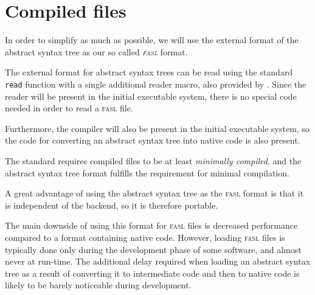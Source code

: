 \chapter{Compiled files}
\label{chap-compiled-files}

In order to simplify \sysname{} as much as possible, we will use the
external format of the \iconoclast{} abstract syntax tree as our so
called \emph{\textsc{fasl}} format.

The external format for abstract syntax trees can be read using the
\commonlisp{} standard \texttt{read} function with a single additional
reader macro, also provided by \cleavir{}.  Since the \commonlisp{}
reader will be present in the initial executable \sysname{} system,
there is no special code needed in order to read a \textsc{fasl} file.

Furthermore, the compiler will also be present in the initial
executable \sysname{} system, so the code for converting an abstract
syntax tree into native code is also present.

The \commonlisp{} standard requires compiled files to be at least
\emph{minimally compiled}, and the abstract syntax tree format
fulfills the requirement for minimal compilation.

A great advantage of using the abstract syntax tree as the
\textsc{fasl} format is that it is independent of the backend, so it
is therefore portable.

The main downside of using this format for \textsc{fasl} files is
decreased performance compared to a format containing native code.
However, loading \textsc{fasl} files is typically done only during the
development phase of some software, and almost never at run-time.  The
additional delay required when loading an abstract syntax tree as a
result of converting it to intermediate code and then to native code
is likely to be barely noticeable during development.
